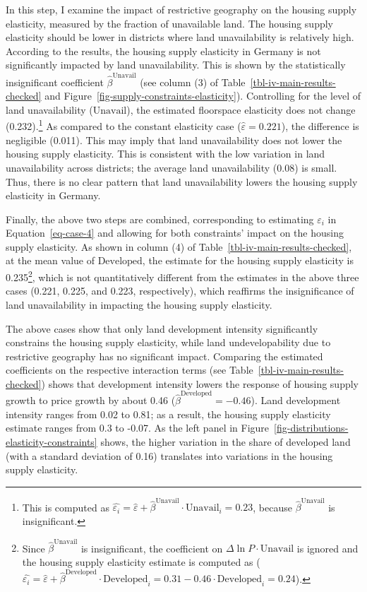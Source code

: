 \documentclass[
  12pt,
]{article}
\begin{document}
In this step, I examine the impact of restrictive geography on the
housing supply elasticity, measured by the fraction of unavailable land.
The housing supply elasticity should be lower in districts where land
unavailability is relatively high. According to the results, the housing
supply elasticity in Germany is not significantly impacted by land
unavailability. This is shown by the statistically insignificant
coefficient \(\widehat{\beta}^{\text{Unavail}}\) (see column (3) of
Table~\ref{tbl-iv-main-results-checked} and
Figure~\ref{fig-supply-constraints-elasticity}). Controlling for the
level of land unavailability (\(\text{Unavail}\)), the estimated
floorspace elasticity does not change (0.232).\footnote{This is computed
  as
  \(\widehat{\varepsilon_i} =\widehat{\varepsilon} + \widehat{\beta}^{\text{Unavail}}\cdot\text{Unavail}_i = 0.23\),
  because \(\widehat{\beta}^{\text{Unavail}}\) is insignificant.} As
compared to the constant elasticity case
(\(\widehat{\varepsilon}=0.221\)), the difference is negligible (0.011).
This may imply that land unavailability does not lower the housing
supply elasticity. This is consistent with the low variation in land
unavailability across districts; the average land unavailability (0.08)
is small. Thus, there is no clear pattern that land unavailability
lowers the housing supply elasticity in Germany.

Finally, the above two steps are combined, corresponding to estimating
\(\varepsilon_i\) in Equation~\ref{eq-case-4} and allowing for both
constraints' impact on the housing supply elasticity. As shown in column
(4) of Table~\ref{tbl-iv-main-results-checked}, at the mean value of
\(\text{Developed}\), the estimate for the housing supply elasticity is
0.235\footnote{Since \(\widehat{\beta}^{\text{Unavail}}\) is
  insignificant, the coefficient on \(\Delta\ln P\cdot\text{Unavail}\)
  is ignored and the housing supply elasticity estimate is computed as
  (\(\widehat{\varepsilon_i} = \widehat{\varepsilon} + \widehat{\beta}^{\text{Developed}}\cdot\text{Developed}_i = 0.31 -0.46 \cdot\text{Developed}_i = 0.24\)).},
which is not quantitatively different from the estimates in the above
three cases (0.221, 0.225, and 0.223, respectively), which reaffirms the
insignificance of land unavailability in impacting the housing supply
elasticity.

The above cases show that only land development intensity significantly
constrains the housing supply elasticity, while land undevelopability
due to restrictive geography has no significant impact. Comparing the
estimated coefficients on the respective interaction terms (see
Table~\ref{tbl-iv-main-results-checked}) shows that development
intensity lowers the response of housing supply growth to price growth
by about 0.46 (\(\widehat{\beta}^{\text{Developed}} = -0.46\)). Land
development intensity ranges from 0.02 to 0.81; as a result, the housing
supply elasticity estimate ranges from 0.3 to -0.07. As the left panel
in Figure~\ref{fig-distributions-elasticity-constraints} shows, the
higher variation in the share of developed land (with a standard
deviation of 0.16) translates into variations in the housing supply
elasticity.
\end{document}
